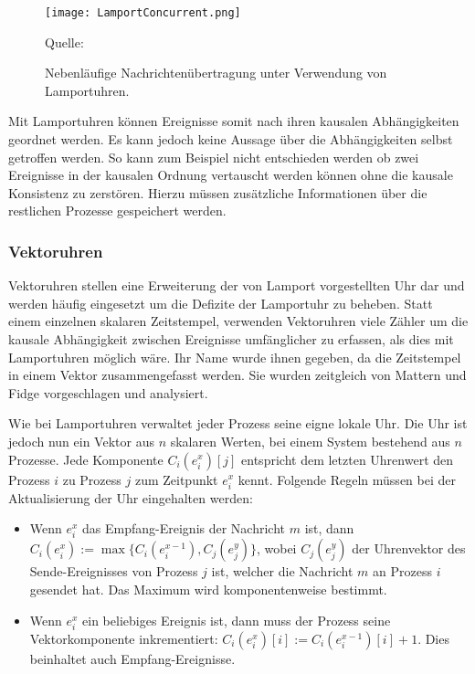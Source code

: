 \begin{figure}[ht]
    \centering
    \texttt{[image: LamportConcurrent.png]}
    \caption[Lamportuhren und Kausalität]{Nebenläufige Nachrichtenübertragung unter Verwendung von Lamportuhren.}
    Quelle: \cite{Tanenbaum2007}
    \label{fig:LamportConcurrent}
\end{figure}

Mit Lamportuhren können Ereignisse somit nach ihren kausalen Abhängigkeiten geordnet werden.
Es kann jedoch keine Aussage über die Abhängigkeiten selbst getroffen werden.
So kann zum Beispiel nicht entschieden werden ob zwei Ereignisse in der kausalen Ordnung vertauscht werden können ohne die kausale Konsistenz zu zerstören.
Hierzu müssen zusätzliche Informationen über die restlichen Prozesse gespeichert werden.

\subsubsection{Vektoruhren}
Vektoruhren stellen eine Erweiterung der von Lamport vorgestellten Uhr dar und werden häufig eingesetzt um die Defizite der Lamportuhr zu beheben.
Statt einem einzelnen skalaren Zeitstempel, verwenden Vektoruhren viele Zähler um die kausale Abhängigkeit zwischen Ereignisse umfänglicher zu erfassen, als dies mit Lamportuhren möglich wäre.
Ihr Name wurde ihnen gegeben, da die Zeitstempel in einem Vektor zusammengefasst werden.
Sie wurden zeitgleich von Mattern \cite{mattern1989virtual} und Fidge \cite{fidge1991logical, fidge1988timestamps} vorgeschlagen und analysiert.

Wie bei Lamportuhren verwaltet jeder Prozess seine eigne lokale Uhr.
Die Uhr ist jedoch nun ein Vektor aus $n$ skalaren Werten, bei einem System bestehend aus $n$ Prozesse.
Jede Komponente $C_i(e_i^x)[j]$ entspricht dem letzten Uhrenwert den Prozess $i$ zu Prozess $j$ zum Zeitpunkt $e_i^x$ kennt.
Folgende Regeln müssen bei der Aktualisierung der Uhr eingehalten werden:
\begin{itemize}
    \item Wenn $e_i^x$ das Empfang-Ereignis der Nachricht $m$ ist, dann $C_i(e_i^x):=\max\{ C_i(e_i^{x-1}), C_j(e_j^y) \}$, wobei $C_j(e_j^y)$ der Uhrenvektor des Sende-Ereignisses von Prozess $j$ ist, welcher die Nachricht $m$ an Prozess $i$ gesendet hat. Das Maximum wird komponentenweise bestimmt.
    \item Wenn $e_i^x$ ein beliebiges Ereignis ist, dann muss der Prozess seine Vektorkomponente inkrementiert: $C_i(e_i^x)[i]:=C_i(e_i^{x-1})[i] + 1$. Dies beinhaltet auch Empfang-Ereignisse.
\end{itemize}

